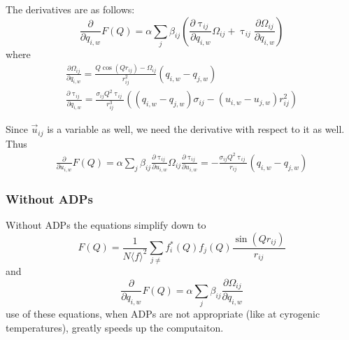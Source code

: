 \noindent The derivatives are as follows:
\begin{equation}
\frac{\partial}{\partial q_{i,w}} F{ (Q )} = \alpha \sum_{j} \beta_{ij} (\frac{\partial \uptau_{ij}}{\partial q_{i,w}}  \Omega_{ij} + \uptau_{ij} \frac{\partial \Omega_{ij}}{\partial q_{i,w}})
\end{equation}
where
\begin{eqnarray}
  \frac{\partial \Omega_{ij}}{\partial q_{i,w}}  = \frac{Q\cos(Qr_{ij}) - \Omega_{ij}}{r_{ij}^{2}} (q_{i,w}-q_{j,w})\\
  \frac{\partial \uptau_{ij}}{\partial q_{i,w}} = \frac{\sigma_{ij}Q^{2} \uptau_{ij}}{r_{ij}^{3}}   ((q_{i,w} - q_{j,w}) \sigma_{ij}- ( u_{i,w} - u_{j,w})r_{ij}^{2})
\end{eqnarray}

Since $\vec{u}_{ij}$ is a variable as well, we need the derivative with respect to it as well.
Thus
\begin{eqnarray}
\frac{\partial}{\partial u_{i,w}} F{ (Q )} = \alpha \sum_{j} \beta_{ij} \frac{\partial \uptau_{ij}}{\partial u_{i,w}}  \Omega_{ij}
\frac{\partial \uptau_{ij}}{\partial u_{i,w}} = - \frac{\sigma_{ij}Q^{2} \uptau_{ij}}{r_{ij}}  (q_{i,w} - q_{j,w})
\end{eqnarray}
\subsubsection{Without ADPs}
Without ADPs the equations simplify down to
\begin{equation}
F(Q) = \frac{1}{N \langle f \rangle^{2}} \sum_{j\neq} f_i^{*}(Q)f_j(Q) \frac{\sin(Qr_{ij})}{r_{ij}}
\end{equation}
and
 \begin{equation}
\frac{\partial}{\partial q_{i,w}} F{ (Q )} = \alpha \sum_{j} \beta_{ij} \frac{\partial \Omega_{ij}}{\partial q_{i,w}}
\end{equation}
use of these equations, when ADPs are not appropriate (like at cyrogenic temperatures), greatly speeds up the computaiton.

